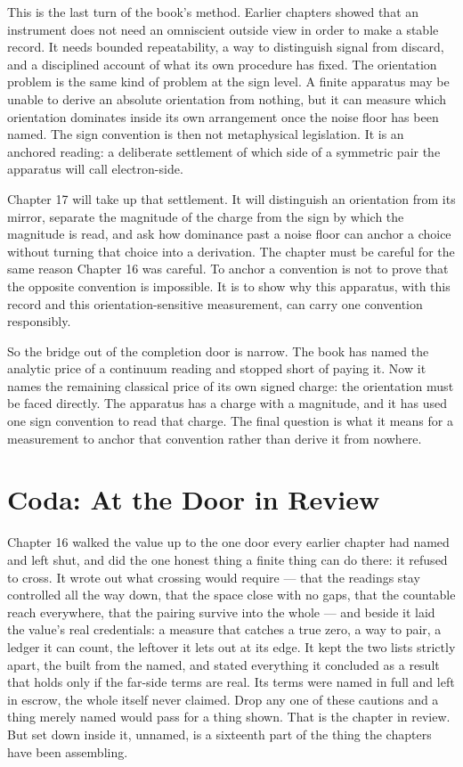 This is the last turn of the book's method. Earlier chapters showed that an
instrument does not need an omniscient outside view in order to make a stable
record. It needs bounded repeatability, a way to distinguish signal from
discard, and a disciplined account of what its own procedure has fixed. The
orientation problem is the same kind of problem at the sign level. A finite
apparatus may be unable to derive an absolute orientation from nothing, but it
can measure which orientation dominates inside its own arrangement once the
noise floor has been named. The sign convention is then not metaphysical
legislation. It is an anchored reading: a deliberate settlement of which side
of a symmetric pair the apparatus will call electron-side.

Chapter 17 will take up that settlement. It will distinguish an orientation
from its mirror, separate the magnitude of the charge from the sign by which
the magnitude is read, and ask how dominance past a noise floor can anchor a
choice without turning that choice into a derivation. The chapter must be
careful for the same reason Chapter 16 was careful. To anchor a convention is
not to prove that the opposite convention is impossible. It is to show why this
apparatus, with this record and this orientation-sensitive measurement, can
carry one convention responsibly.

So the bridge out of the completion door is narrow. The book has named the
analytic price of a continuum reading and stopped short of paying it. Now it
names the remaining classical price of its own signed charge: the orientation
must be faced directly. The apparatus has a charge with a magnitude, and it has
used one sign convention to read that charge. The final question is what it
means for a measurement to anchor that convention rather than derive it from
nowhere.

\section*{Coda: At the Door in Review}

Chapter 16 walked the value up to the one door every earlier chapter had named and left shut, and did the one honest thing a finite thing can do there: it refused to cross. It wrote out what crossing would require --- that the readings stay controlled all the way down, that the space close with no gaps, that the countable reach everywhere, that the pairing survive into the whole --- and beside it laid the value's real credentials: a measure that catches a true zero, a way to pair, a ledger it can count, the leftover it lets out at its edge. It kept the two lists strictly apart, the built from the named, and stated everything it concluded as a result that holds only if the far-side terms are real. Its terms were named in full and left in escrow, the whole itself never claimed. Drop any one of these cautions and a thing merely named would pass for a thing shown. That is the chapter in review. But set down inside it, unnamed, is a sixteenth part of the thing the chapters have been assembling.

